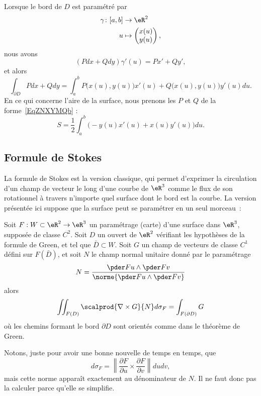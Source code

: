 Lorsque le bord de \( D\) est paramétré par
\begin{equation}
	\begin{aligned}
		\gamma\colon \mathopen[ a , b \mathclose] & \to \eR^2                            \\
		u                                         & \mapsto \begin{pmatrix}
			x(u) \\
			y(u)
		\end{pmatrix},
	\end{aligned}
\end{equation}
nous avons
\begin{equation}
	(Pdx+Qdy)\gamma'(u)=Px'+Qy',
\end{equation}
et alors
\begin{equation}
	\int_{\partial D}Pdx+Qdy=\int_a^b P\big( x(u),y(u) \big)x'(u)+Q\big( x(u),y(u) \big)y'(u)du.
\end{equation}
En ce qui concerne l'aire de la surface, nous prenons les \( P\) et \( Q\) de la forme~\ref{EqZNXYMQb} :
\begin{equation}    \label{EqAJGrtOk}
	S=\frac{ 1 }{2}\int_a^b\Big( -y(u)x'(u)+x(u)y'(u) \Big)du.
\end{equation}

\subsection{Formule de Stokes}
\label{secstokesusuel}

La formule de Stokes est la version classique, qui permet d'exprimer la circulation d'un champ de vecteur le long d'une courbe de $\eR^3$ comme le flux de son rotationnel à travers n'importe quel surface dont le bord est la courbe. La version présentée ici suppose que la surface peut se paramétrer en un seul morceau~:
\begin{theorem}
	Soit $F : W\subset \eR^2 \to \eR^3$ un paramétrage (carte) d'une surface dans $\eR^3$, supposée de classe $C^2$. Soit $D$ un ouvert de $\eR^2$ vérifiant les hypothèses de la formule de Green, et tel que $\bar D \subset W$. Soit $G$ un champ de vecteurs de classe $C^1$ défini sur $F(\bar D)$, et soit $N$ le champ normal unitaire donné par le paramétrage
	\begin{equation}
		N = \frac{\pder F u \wedge \pder F v}{\norme{\pder F u \wedge \pder F v}}
	\end{equation}
	alors
	\begin{equation}\label{EqStokesTho}
		\iint_{F(D)} \scalprod{\nabla\times G}{N} d\sigma_F = \int_{F(\partial D)} G
	\end{equation}
	où les chemins formant le bord $\partial D$ sont orientés comme dans le théorème de Green.
\end{theorem}
Notons, juste pour avoir une bonne nouvelle de temps en temps, que
\begin{equation}
	d\sigma_F=\left\| \frac{ \partial F }{ \partial u }\times\frac{ \partial F }{ \partial v }  \right\|dudv,
\end{equation}
mais cette norme apparaît exactement au dénominateur de $N$. Il ne faut donc pas la calculer parce qu'elle se simplifie.


